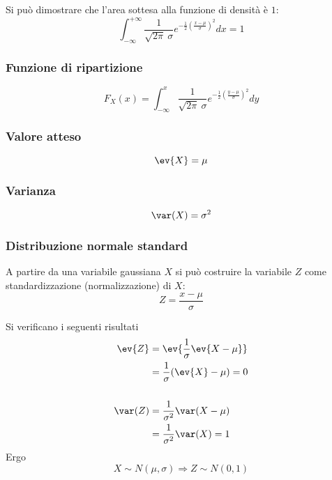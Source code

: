 Si può dimostrare che l'area sottesa alla funzione di densità è $1$:
\begin{equation*}
	\int_{-\infty}^{+\infty} \frac{1}{\sqrt{2\pi}~\sigma} e^{-\frac{1}{2}\left(\frac{x-\mu}{\sigma}\right)^2} dx = 1
\end{equation*}


\subsubsection{Funzione di ripartizione}
\begin{equation*}
	F_X(x) = \int_{-\infty}^x \frac{1}{\sqrt{2\pi}~\sigma} e^{-\frac{1}{2}\left(\frac{y-\mu}{\sigma}\right)^2} dy
\end{equation*}


\subsubsection{Valore atteso}
\begin{equation*}
	\ev{X} = \mu
\end{equation*}


\subsubsection{Varianza}
\begin{equation*}
	\var(X) = \sigma^2
\end{equation*}


\subsubsection{Distribuzione normale standard}
A partire da una variabile gaussiana $X$ si può costruire la variabile $Z$ come standardizzazione (normalizzazione) di $X$:
\begin{equation*}
	Z = \frac{x-\mu}{\sigma}
\end{equation*}

\noindent
Si verificano i seguenti risultati
\begin{align*}
	\ev{Z}  & = \ev{\frac{1}{\sigma}\ev{X-\mu}}  \\
	        & = \frac{1}{\sigma}(\ev{X}-\mu) = 0 \\
	\\
	\var(Z) & = \frac{1}{\sigma^2} \var(X-\mu)   \\
	        & = \frac{1}{\sigma^2}\var(X) = 1
\end{align*}
Ergo
\begin{equation*}
	X\sim N(\mu,\sigma) \Rightarrow Z\sim N(0,1)
\end{equation*}

